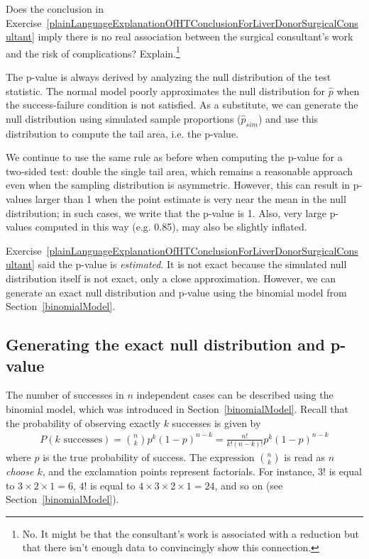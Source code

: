 \begin{exercise}
Does the conclusion in Exercise~\ref{plainLanguageExplanationOfHTConclusionForLiverDonorSurgicalConsultant} imply there is no real association between the surgical consultant's work and the risk of complications? Explain.\footnote{No. It might be that the consultant's work is associated with a reduction but that there isn't enough data to convincingly show this connection.}
\end{exercise}

\begin{termBox}{
The p-value is always derived by analyzing the null distribution of the test statistic. The normal model poorly approximates the null distribution for $\hat{p}$ when the success-failure condition is not satisfied. As a substitute, we can generate the null distribution using simulated sample proportions ($\hat{p}_{sim}$) and use this distribution to compute the tail area, i.e. the p-value.}
\end{termBox}

We continue to use the same rule as before when computing the p-value for a two-sided test: double the single tail area, which remains a reasonable approach even when the sampling distribution is asymmetric. However, this can result in p-values larger than 1 when the point estimate is very near the mean in the null distribution; in such cases, we write that the p-value is 1. Also, very large p-values computed in this way (e.g. 0.85), may also be slightly inflated.

Exercise~\ref{plainLanguageExplanationOfHTConclusionForLiverDonorSurgicalConsultant} said the p-value is \emph{estimated}. It is not exact because the simulated null distribution itself is not exact, only a close approximation. However, we can generate an exact null distribution and p-value using the binomial model from Section~\ref{binomialModel}.

\subsection{Generating the exact null distribution and p-value}
\label{exactNullDistributionUsingBinomialModel}

The number of successes in $n$ independent cases can be described using the binomial model, which was introduced in Section~\ref{binomialModel}. Recall that the probability of observing exactly $k$ successes is given by
\begin{align} \label{binomialEquationShownForFindingNullDistributionInSmallSamplePropTest}
P(k\text{ successes}) = {n\choose k} p^{k}(1-p)^{n-k} = \frac{n!}{k!(n-k)!} p^{k}(1-p)^{n-k}
\end{align}
where $p$ is the true probability of success. The expression ${n\choose k}$ is read as \emph{$n$ choose $k$}, and the exclamation points represent factorials. For instance, $3!$ is equal to $3\times 2\times 1=6$, $4!$ is equal to $4\times 3\times 2\times 1 = 24$, and so on (see Section~\ref{binomialModel}).

